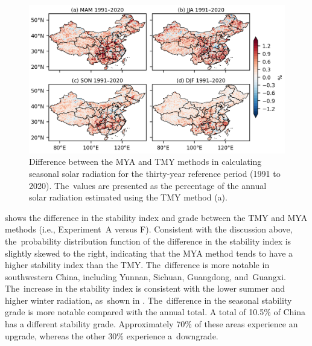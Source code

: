 \documentclass[atmosphere,article,accept,pdftex,moreauthors]{Definitions/mdpi}
\begin{document}
\begin{figure}[H]
  \includegraphics[width=13.8cm]{fig/mya-tmy-seasonal-30yr.png}
  \caption{Difference between the MYA and TMY methods in calculating seasonal solar radiation for the thirty-year reference period (1991 to 2020). The~values are presented as the percentage of the annual solar radiation estimated using the TMY method (a). \label{fig:tmy_mya_diff_sea}}
\end{figure}

 shows the difference in the stability index and grade between the TMY and MYA methods (i.e., Experiment~A versus F). Consistent with the discussion above, the~probability distribution function of the difference in the stability index is slightly skewed to the right, indicating that the MYA method tends to have a higher stability index than the TMY. The~difference is more notable in southwestern China, including Yunnan, Sichuan, Guangdong, and~Guangxi. The~increase in the stability index is consistent with the lower summer and higher winter radiation, as~shown in . The~difference in the seasonal stability grade is more notable compared with the annual total. A total of 10.5\% of China has a different stability grade. Approximately 70\% of these areas experience an upgrade, whereas the other 30\% experience a~downgrade.
\end{document}
